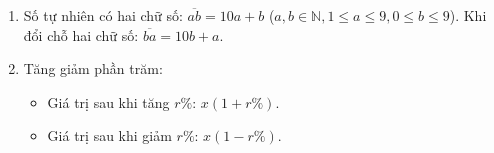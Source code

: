 \begin{enumerate}
\item Số tự nhiên có hai chữ số: $\overline{ab} = 10a + b$ ($a, b \in \mathbb{N}, 1 \le a \le 9, 0 \le b \le 9$). Khi đổi chỗ hai chữ số: $\overline{ba} = 10b + a$.
\item Tăng giảm phần trăm:
\begin{itemize}
\item Giá trị sau khi tăng $r\%$: $x(1 + r\%)$.
\item Giá trị sau khi giảm $r\%$: $x(1 - r\%)$.
\end{itemize}
\end{enumerate}
